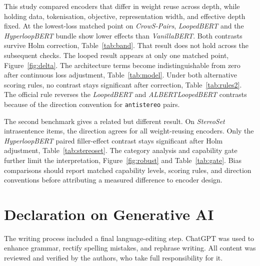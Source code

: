 \documentclass[sigconf,natbib=true,anonymous=true]{acmart}
\begin{document}
This study compared encoders that differ in weight reuse across depth, while
holding data, tokenisation, objective, representation width, and effective depth
fixed. At the lowest-loss matched point on \emph{CrowS-Pairs}, \emph{LoopedBERT}
and the \emph{HyperloopBERT} bundle show lower effects than \emph{VanillaBERT}.
Both contrasts survive Holm correction, Table~\ref{tab:band}. That result does
not hold across the subsequent checks. The looped result appears at only one
matched point, Figure~\ref{fig:delta}. The architecture terms become
indistinguishable from zero after continuous loss adjustment,
Table~\ref{tab:model}. Under both alternative scoring rules, no contrast stays
significant after correction, Table~\ref{tab:rules2}. The official rule reverses
the \emph{LoopedBERT} and \emph{ALBERTLoopedBERT} contrasts because of the
direction convention for \texttt{antistereo} pairs.

The second benchmark gives a related but different result. On \emph{StereoSet}
intrasentence items, the direction agrees for all weight-reusing encoders. Only
the \emph{HyperloopBERT} paired filler-effect contrast stays significant after
Holm adjustment, Table~\ref{tab:stereoset}. The category analysis and capability
gate further limit the interpretation, Figure~\ref{fig:robust} and
Table~\ref{tab:gate}. Bias comparisons should report matched capability levels,
scoring rules, and direction conventions before attributing a measured
difference to encoder design.

\section*{Declaration on Generative AI}

The writing process included a final language-editing step. ChatGPT was used to
enhance grammar, rectify spelling mistakes, and rephrase writing. All content
was reviewed and verified by the authors, who take full responsibility for it.



\end{document}
